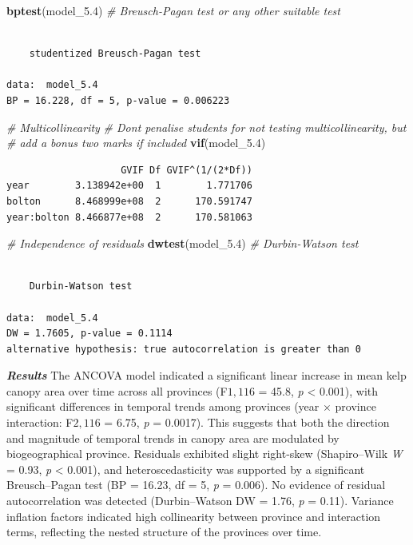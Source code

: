 \documentclass[
  british,
  10pt,
]{article}
\newenvironment{Shaded}{\begin{snugshade}}{\end{snugshade}}
\newcommand{\CommentTok}[1]{\textcolor[rgb]{0.56,0.35,0.01}{\textit{#1}}}
\newcommand{\FloatTok}[1]{\textcolor[rgb]{0.00,0.00,0.81}{#1}}
\newcommand{\FunctionTok}[1]{\textcolor[rgb]{0.13,0.29,0.53}{\textbf{#1}}}
\newcommand{\NormalTok}[1]{#1}
\begin{document}
\begin{Shaded}
\begin{Highlighting}[]
\FunctionTok{bptest}\NormalTok{(model\_5}\FloatTok{.4}\NormalTok{)  }\CommentTok{\# Breusch{-}Pagan test or any other suitable test}
\end{Highlighting}
\end{Shaded}

\begin{verbatim}

    studentized Breusch-Pagan test

data:  model_5.4
BP = 16.228, df = 5, p-value = 0.006223
\end{verbatim}

\begin{Shaded}
\begin{Highlighting}[]
\CommentTok{\# Multicollinearity}
\CommentTok{\# Don\textquotesingle{}t penalise students for not testing multicollinearity, but}
\CommentTok{\# add a bonus two marks if included}
\FunctionTok{vif}\NormalTok{(model\_5}\FloatTok{.4}\NormalTok{)}
\end{Highlighting}
\end{Shaded}

\begin{verbatim}
                    GVIF Df GVIF^(1/(2*Df))
year        3.138942e+00  1        1.771706
bolton      8.468999e+08  2      170.591747
year:bolton 8.466877e+08  2      170.581063
\end{verbatim}

\begin{Shaded}
\begin{Highlighting}[]
\CommentTok{\# Independence of residuals}
\FunctionTok{dwtest}\NormalTok{(model\_5}\FloatTok{.4}\NormalTok{)  }\CommentTok{\# Durbin{-}Watson test}
\end{Highlighting}
\end{Shaded}

\begin{verbatim}

    Durbin-Watson test

data:  model_5.4
DW = 1.7605, p-value = 0.1114
alternative hypothesis: true autocorrelation is greater than 0
\end{verbatim}

\textbf{\emph{Results}} The ANCOVA model indicated a significant linear
increase in mean kelp canopy area over time across all provinces
(F\({1,116}\) = 45.8, \emph{p} \textless{} 0.001), with significant
differences in temporal trends among provinces (year × province
interaction: F\({2,116}\) = 6.75, \emph{p} = 0.0017). This suggests that
both the direction and magnitude of temporal trends in canopy area are
modulated by biogeographical province. Residuals exhibited slight
right-skew (Shapiro--Wilk \emph{W} = 0.93, \emph{p} \textless{} 0.001),
and heteroscedasticity was supported by a significant Breusch--Pagan
test (BP = 16.23, df = 5, \emph{p} = 0.006). No evidence of residual
autocorrelation was detected (Durbin--Watson DW = 1.76, \emph{p} =
0.11). Variance inflation factors indicated high collinearity between
province and interaction terms, reflecting the nested structure of the
provinces over time.
\end{document}
